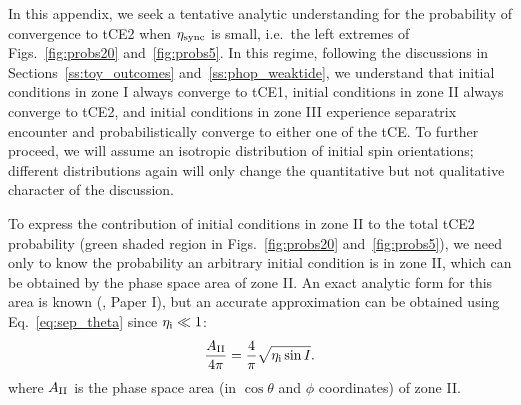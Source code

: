 \documentclass[
        fleqn,
        usenatbib,
    ]{mnras}
\begin{document}
In this appendix, we seek a tentative analytic understanding for the
probability of convergence to tCE2 when $\eta_{\rm sync}$ is small, i.e.\ the
left extremes of Figs.~\ref{fig:probs20} and~\ref{fig:probs5}. In this regime,
following the discussions in Sections~\ref{ss:toy_outcomes}
and~\ref{ss:phop_weaktide}, we understand that initial conditions in zone I
always converge to tCE1, initial conditions in zone II always converge to tCE2,
and initial conditions in zone III experience separatrix encounter and
probabilistically converge to either one of the tCE\@. To further proceed, we
will assume an isotropic distribution of initial spin orientations; different
distributions again will only change the quantitative but not qualitative
character of the discussion.

To express the contribution of initial conditions in zone II to the total tCE2
probability (green shaded region in Figs.~\ref{fig:probs20}
and~\ref{fig:probs5}), we need only to know the probability an arbitrary
initial condition is in zone II\@, which can be obtained by the phase space
area of zone II\@. An exact analytic form for this area is known
(\citealp{ward2004I}, Paper I), but an accurate approximation can be obtained
using Eq.~\eqref{eq:sep_theta} since $\eta_{\rm i} \ll 1$:
\begin{align}
    \frac{A_{\rm II}}{4\pi} = \frac{4}{\pi}\sqrt{\eta_{\rm i} \sin I}.
\end{align}
where $A_{\rm II}$ is the phase space area (in $\cos \theta$ and $\phi$
coordinates) of zone II\@.
\end{document}
